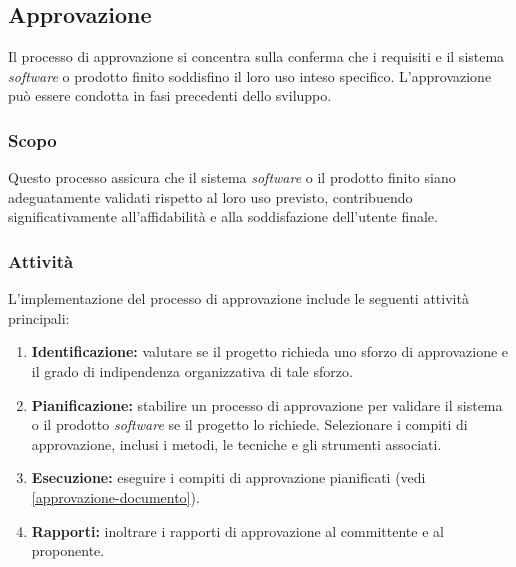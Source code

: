 \subsection{Approvazione}
\label{subsec:approvazione}

Il processo di approvazione si concentra sulla conferma che i requisiti e il
sistema \textit{software} o prodotto finito soddisfino il loro uso inteso
specifico. L'approvazione può essere condotta in fasi precedenti dello sviluppo.

\subsubsection{Scopo}

Questo processo assicura che il sistema \textit{software} o il prodotto finito
siano adeguatamente validati rispetto al loro uso previsto, contribuendo
significativamente all'affidabilità e alla soddisfazione dell'utente finale.

\subsubsection{Attività}
L'implementazione del processo di approvazione include le seguenti attività
principali:

\begin{enumerate}
	\item \textbf{Identificazione:} valutare se il progetto richieda uno sforzo
	      di approvazione e il grado di indipendenza organizzativa di tale
	      sforzo.
	\item \textbf{Pianificazione:} stabilire un processo di approvazione per
	      validare il sistema o il prodotto \textit{software} se il progetto lo
	      richiede. Selezionare i compiti di approvazione, inclusi i metodi, le
	      tecniche e gli strumenti associati.
	\item \textbf{Esecuzione:} eseguire i compiti di approvazione pianificati
	      (vedi \cref{approvazione-documento}).
	\item \textbf{Rapporti:} inoltrare i rapporti di approvazione al committente
	      e al proponente.
\end{enumerate}

